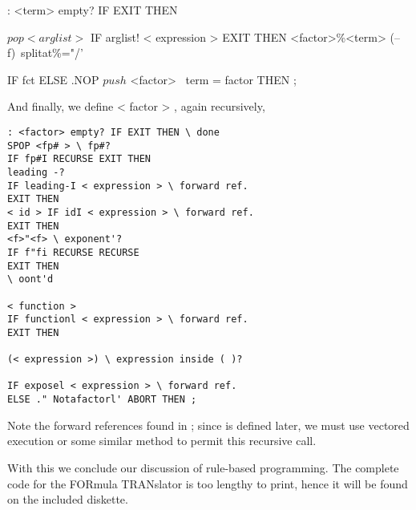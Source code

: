 : <term> empty? IF EXIT THEN

$pop < arglist >$
IF arglist! < expression > EXIT THEN
<factor>\%<term> (--f)\ splitat\%="/'

IF fct%
ELSE .NOP $push$ <factor> \ term = factor
THEN ;

And finally, we define < factor > , again recursively,
\begin{lstlisting}
: <factor> empty? IF EXIT THEN \ done
SPOP <fp# > \ fp#?
IF fp#I RECURSE EXIT THEN
leading -?
IF leading-I < expression > \ forward ref.
EXIT THEN
< id > IF idI < expression > \ forward ref.
EXIT THEN
<f>"<f> \ exponent'?
IF f"fi RECURSE RECURSE
EXIT THEN
\ oont'd

< function >
IF functionl < expression > \ forward ref.
EXIT THEN

(< expression >) \ expression inside ( )?

IF exposel < expression > \ forward ref.
ELSE ." Notafactorl' ABORT THEN ;
\end{lstlisting}

Note the forward references found in ; since  is defined later, we must use vectored execution or some similar method to permit this recursive call.

With this we conclude our discussion of rule-based programming. The complete code for the FORmula TRANslator is too lengthy to print, hence it will be found on the included diskette.
